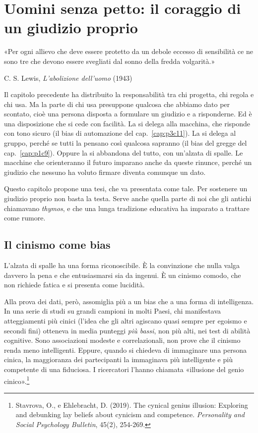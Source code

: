 
\chapter{Uomini senza petto: il coraggio di un giudizio proprio}
\label{cap:p3c24}

\epigraph{«Per ogni allievo che deve essere protetto da un debole eccesso di sensibilità ce ne sono tre che devono essere svegliati dal sonno della fredda volgarità.»}{C. S. Lewis, \textit{L'abolizione dell'uomo} (1943)}

Il capitolo precedente ha distribuito la responsabilità tra chi progetta, chi regola e chi usa. Ma la parte di chi usa presuppone qualcosa che abbiamo dato per scontato, cioè una persona disposta a formulare un giudizio e a risponderne. Ed è una disposizione che si cede con facilità. La si delega alla macchina, che risponde con tono sicuro (il bias di automazione del cap.~\ref{cap:p3c11}). La si delega al gruppo, perché se tutti la pensano così qualcosa sapranno (il bias del gregge del cap.~\ref{cap:p1c9}). Oppure la si abbandona del tutto, con un'alzata di spalle. Le macchine che orienteranno il futuro imparano anche da queste rinunce, perché un giudizio che nessuno ha voluto firmare diventa comunque un dato.

Questo capitolo propone una tesi, che va presentata come tale. Per sostenere un giudizio proprio non basta la testa. Serve anche quella parte di noi che gli antichi chiamavano \textit{thymos}, e che una lunga tradizione educativa ha imparato a trattare come rumore.

\section{Il cinismo come bias}

L'alzata di spalle ha una forma riconoscibile. È la convinzione che nulla valga davvero la pena e che entusiasmarsi sia da ingenui. È un cinismo comodo, che non richiede fatica e si presenta come lucidità.

Alla prova dei dati, però, assomiglia più a un bias che a una forma di intelligenza. In una serie di studi su grandi campioni in molti Paesi, chi manifestava atteggiamenti più cinici (l'idea che gli altri agiscano quasi sempre per egoismo e secondi fini) otteneva in media punteggi \textit{più bassi}, non più alti, nei test di abilità cognitive. Sono associazioni modeste e correlazionali, non prove che il cinismo renda meno intelligenti. Eppure, quando si chiedeva di immaginare una persona cinica, la maggioranza dei partecipanti la immaginava più intelligente e più competente di una fiduciosa. I ricercatori l'hanno chiamata «illusione del genio cinico».\footnote{Stavrova, O., e Ehlebracht, D. (2019). The cynical genius illusion: Exploring and debunking lay beliefs about cynicism and competence. \textit{Personality and Social Psychology Bulletin}, 45(2), 254-269.}

